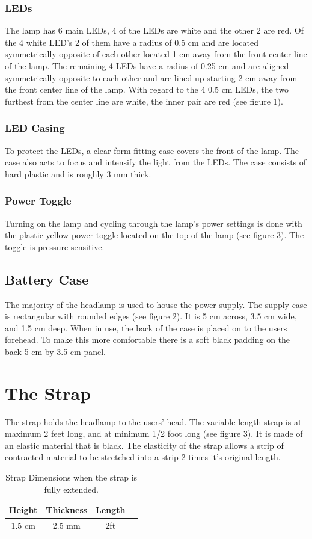 \documentclass[12pt]{article}
\begin{document}
\subsubsection{LEDs}
The lamp has 6 main LEDs, 4 of the LEDs are white and the other 2 are red. Of the 4 white LED's
2 of them have a radius of 0.5 cm and are located symmetrically opposite of each other located 1 cm
away from the front center line of the lamp.  The remaining 4 LEDs have a radius of 0.25 cm and are
aligned symmetrically opposite to each other and are lined up starting 2 cm away from the front
center line of the lamp. With regard to the 4 0.5 cm LEDs, the two furthest from the center line are
white, the inner pair are red (see figure 1).

\subsubsection{LED Casing}
To protect the LEDs, a clear form fitting case covers the front of the lamp.  The case also acts to
focus and intensify the light from the LEDs. The case consists of hard plastic and is roughly
3 mm thick.

\subsubsection{Power Toggle}
Turning on the lamp and cycling through the lamp's power settings is done with the plastic yellow
power toggle located on the top of the lamp (see figure 3). The toggle is pressure sensitive.

\subsection{Battery Case}
The majority of the headlamp is used to house the power supply. The supply case is rectangular with
rounded edges (see figure 2). It is 5 cm across, 3.5 cm wide, and 1.5 cm deep. When in use, the back of
the case is placed on to the users forehead. To make this more comfortable there is a soft black
padding on the back 5 cm by 3.5 cm panel.

\section{The Strap}
The strap holds the headlamp to the users' head. The variable-length strap
is at maximum 2 feet long, and at minimum 1/2 foot long (see figure 3). It is made of an elastic material that
is black. The elasticity of the strap allows a strip of contracted material to be stretched into a
strip 2 times it's original length.
\begin{table}
\begin{center}
\begin{tabular}{ | c | c | c | p{5cm} |}
    \hline
    Height & Thickness & Length \\ \hline
    1.5 cm & 2.5 mm & 2ft  \\ \hline
\end{tabular}
\end{center}
\caption[Strap Dimensions]{Strap Dimensions when the strap is fully extended.}

\end{table}
\end{document}
